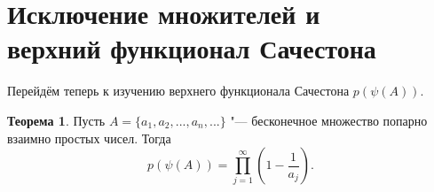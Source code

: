 \documentclass[a4paper,openbib]{article}
\theoremstyle{definition}
\newtheorem{theorem}[lemma]{Теорема}
\begin{document}
\section{Исключение множителей и \\ верхний функционал Сачестона}


Перейдём теперь к изучению верхнего функционала Сачестона $p(\psi(A))$.

\begin{theorem}
	\label{thm:ac0_primes_p_psi_A_prod}
	Пусть $A = \{a_1, a_2, ..., a_n,...\}$ "--- бесконечное множество попарно взаимно простых чисел.
	Тогда
	\begin{equation}
		p(\psi(A)) = \prod_{j=1}^\infty \left(1-\frac{1}{a_j}\right)
		.
	\end{equation}
\end{theorem}
\end{document}
